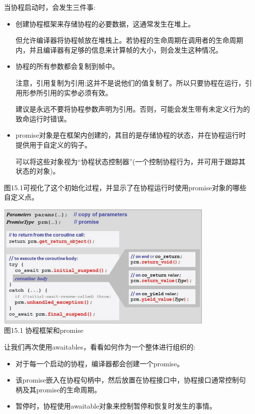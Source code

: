 
当协程启动时，会发生三件事:

\begin{itemize}
\item 
创建协程框架来存储协程的必要数据，这通常发生在堆上。

但允许编译器将协程帧放在堆栈上。若协程的生命周期在调用者的生命周期内，并且编译器有足够的信息来计算帧的大小，则会发生这种情况。

\item 
协程的所有参数都会复制到帧中。

注意，引用复制为引用;这并不是说他们的值复制了。所以只要协程在运行，引用形参所引用的实参必须有效。

建议是永远不要将协程参数声明为引用。否则，可能会发生带有未定义行为的致命运行时错误。

\item 
promise对象是在框架内创建的，其目的是存储协程的状态，并在协程运行时提供用于自定义的钩子。

可以将这些对象视为“协程状态控制器”(一个控制协程行为，并可用于跟踪其状态的对象)。
\end{itemize}

图15.1可视化了这个初始化过程，并显示了在协程运行时使用promise对象的哪些自定义点。

\begin{center}
\includegraphics[width=0.8\textwidth]{content/chapter15/images/1.png}\\
图15.1 协程框架和promise
\end{center}


让我们再次使用awaitables，看看如何作为一个整体进行组织的:

\begin{itemize}
\item 
对于每一个启动的协程，编译器都会创建一个promise。

\item 
该promise嵌入在协程句柄中，然后放置在协程接口中，协程接口通常控制句柄及其promise的生命周期。

\item 
暂停时，协程使用awaitable对象来控制暂停和恢复时发生的事情。
\end{itemize}

